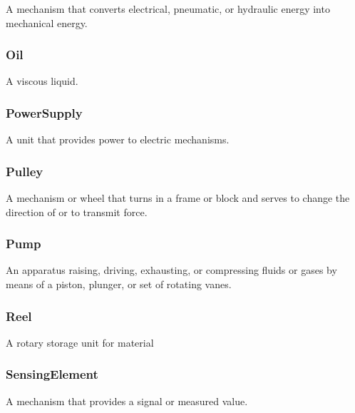 A mechanism that converts electrical, pneumatic, or hydraulic energy into mechanical energy.

\FloatBarrier

\subsubsection{Oil}
  \label{sec:Oil}


A viscous liquid.

\FloatBarrier

\subsubsection{PowerSupply}
  \label{sec:PowerSupply}


A unit that provides power to electric mechanisms.

\FloatBarrier

\subsubsection{Pulley}
  \label{sec:Pulley}


A mechanism or wheel that turns in a frame or block and serves to change the direction of or to transmit force.

\FloatBarrier

\subsubsection{Pump}
  \label{sec:Pump}


An apparatus raising, driving, exhausting, or compressing fluids or gases by means of a piston, plunger, or set of rotating vanes.

\FloatBarrier

\subsubsection{Reel}
  \label{sec:Reel}


A rotary storage unit for material

\FloatBarrier

\subsubsection{SensingElement}
  \label{sec:SensingElement}


A mechanism that provides a signal or measured value.

\FloatBarrier

